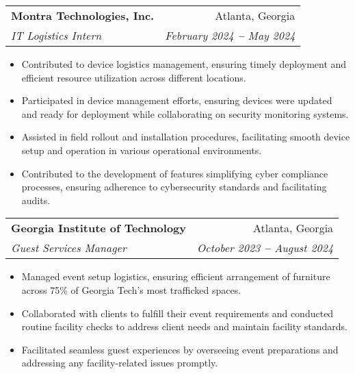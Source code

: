 \documentclass[letterpaper,11pt]{article}
\makeatletter
\newcommand{\resumeItem}[1]{
  \item\small{
    {#1 \vspace{-2pt}}
  }
}
\newcommand{\resumeSubheading}[4]{
  \vspace{-2pt}\item
    \begin{tabular*}{0.97\textwidth}[t]{l@{\extracolsep{\fill}}r}
      \textbf{#1} & #2 \\
      \textit{\small#3} & \textit{\small #4} \\
    \end{tabular*}\vspace{-7pt}
}
\newcommand{\resumeItemListStart}{\begin{itemize}}
\newcommand{\resumeItemListEnd}{\end{itemize}\vspace{-5pt}}
\makeatother
\begin{document}
    \resumeSubheading
      {Montra Technologies, Inc.}{Atlanta, Georgia}
      {IT Logistics Intern}{February 2024 \textbf{--} May 2024}
        \resumeItemListStart
        \resumeItem{Contributed to device logistics management, ensuring timely deployment and efficient resource utilization across different locations.}
        \resumeItem{Participated in device management efforts, ensuring devices were updated and ready for deployment while collaborating on security monitoring systems.}
        \resumeItem{Assisted in field rollout and installation procedures, facilitating smooth device setup and operation in various operational environments.}
        \resumeItem{Contributed to the development of features simplifying cyber compliance processes, ensuring adherence to cybersecurity standards and facilitating audits.}
        \resumeItemListEnd

  \resumeSubheading
      {Georgia Institute of Technology}{Atlanta, Georgia}
      {Guest Services Manager}{October 2023 \textbf{--} August 2024}
        \resumeItemListStart
            \resumeItem{Managed event setup logistics, ensuring efficient arrangement of furniture across 75\% of Georgia Tech's most trafficked spaces.}
            \resumeItem{Collaborated with clients to fulfill their event requirements and conducted routine facility checks to address client needs and maintain facility standards.}
            \resumeItem{Facilitated seamless guest experiences by overseeing event preparations and addressing any facility-related issues promptly.}
        \resumeItemListEnd
\end{document}
